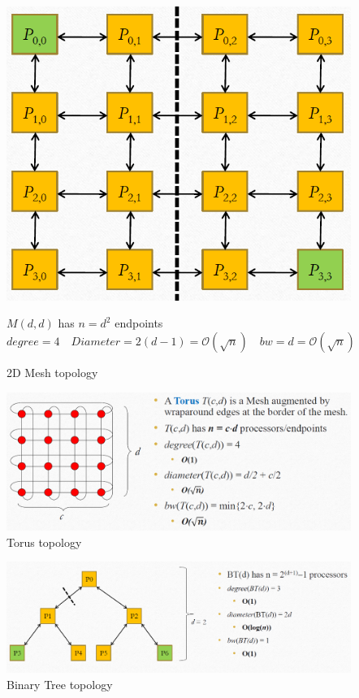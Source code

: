 \begin{figure}[htbp]
   \centering
   \includegraphics{images/05/2d_mesh.png}
   \caption{2D Mesh topology}
   \label{fig:05/2d_mesh}
   $M(d,d)$ has $n=d^2$ endpoints
   $degree = 4 \quad Diameter = 2(d-1) = \mathcal{O}(\sqrt{n}) \quad bw = d = \mathcal{O}(\sqrt{n})$
\end{figure}

\begin{figure}[htbp]
   \centering
   \includegraphics{images/05/torus.png}
   \caption{Torus topology}
   \label{fig:05/torus}
\end{figure}

\begin{figure}[htbp]
   \centering
   \includegraphics{images/05/bintree.png}
   \caption{Binary Tree topology}
   \label{fig:05/bintree}
\end{figure}

